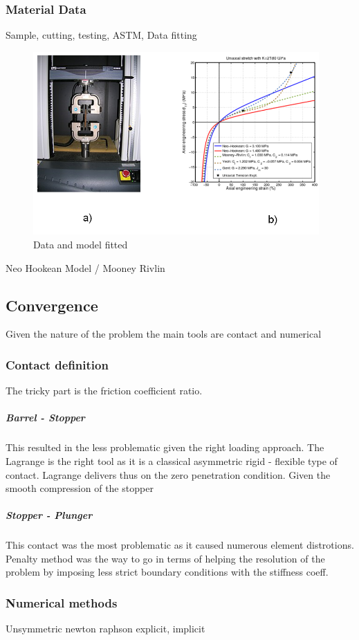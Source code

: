 \subsubsection{Material Data}
Sample, cutting, testing, ASTM, Data fitting

\begin{figure}[h!]	
	\centering
\includegraphics[height=7cm]{img/matdata.PNG}
   \caption{Data and model fitted}
 \label{fgr:PFS}
\end{figure}
Neo Hookean Model / Mooney Rivlin

\newpage
\subsection{Convergence}
Given the nature of the problem the main tools are contact and numerical
\subsubsection{Contact definition}
The tricky part is the friction coefficient ratio.

\subparagraph*{Barrel - Stopper}
This resulted in the less problematic given the right loading approach. The Lagrange is the right tool as it is a classical asymmetric rigid - flexible type of contact. Lagrange delivers thus on the zero penetration condition. Given the smooth compression of the stopper 

\subparagraph*{Stopper - Plunger}
This contact was the most problematic as it caused numerous element distrotions. Penalty method was the way to go in terms of helping the resolution of the problem by imposing less strict boundary conditions with the stiffness coeff. 


\subsubsection{Numerical methods}
Unsymmetric newton raphson explicit, implicit 

